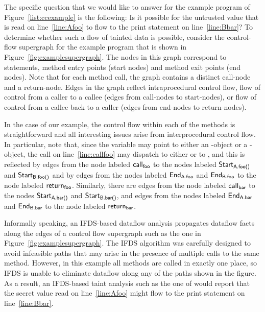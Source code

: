 The specific question that we would like to answer for the example program of
Figure~\ref{list:ccexample} is the following: Is it possible for the untrusted value 
that is read on line~\ref{line:Afoo} to flow to the print statement on line~\ref{line:Bbar}? 
%
To determine whether such a flow of tainted data is possible, consider the control-flow
supergraph for the example program that is shown in Figure~\ref{fig:examplesupergraph}.
 The nodes in this graph correspond to statements, method entry points (start nodes) and 
method exit points (end nodes). Note that for each method call, the graph contains a 
distinct call-node and a return-node. Edges in the graph reflect intraprocedural control flow, 
flow of control from a caller to a callee (edges from call-nodes to start-nodes), or
flow of control from a callee back to a caller (edges from end-nodes to return-nodes). 

In the case of our example, the control flow within each of the methods is straightforward and
all interesting issues arise from interprocedural control flow. In particular,
note that, since the variable  may point to either an -object or a -object, 
the call on line~\ref{line:callfoo} may dispatch to either  or to ,
and this is reflected by edges  
  from the node labeled $\textsf{call}_{\textsf{foo}}$ to the nodes labeled
  $\textsf{Start}_{\textsf{A.foo()}}$ and $\textsf{Start}_{\textsf{B.foo()}}$
and by edges
  from the nodes labeled $\textsf{End}_{\textsf{A.foo}}$ and $\textsf{End}_{\textsf{B.foo}}$ 
  to the node labeled  $\textsf{return}_{\textsf{foo}}$.  
Similarly, there are edges from the node labeled $\textsf{call}_{\textsf{bar}}$ to the nodes 
$\textsf{Start}_{\textsf{A.bar()}}$ and $\textsf{Start}_{\textsf{B.bar()}}$, and 
edges
  from the nodes labeled $\textsf{End}_{\textsf{A.bar}}$ and $\textsf{End}_{\textsf{B.bar}}$ 
  to the node labeled  $\textsf{return}_{\textsf{bar}}$. 
 
Informally speaking, an IFDS-based dataflow analysis propagates dataflow facts along the edges
of a control flow supergraph such as the one in Figure~\ref{fig:examplesupergraph}. The
IFDS algorithm was carefully designed to avoid infeasible paths that may arise in the
presence of multiple calls to the same method. However, in this example all methods are
called in exactly one place, so IFDS is unable to eliminate dataflow along any of the
paths shown in the figure. As a result, an IFDS-based taint analysis such as the
one of  would report that the secret value read on line~\ref{line:Afoo}
might flow to the print statement on line~\ref{line:Bbar}. 

